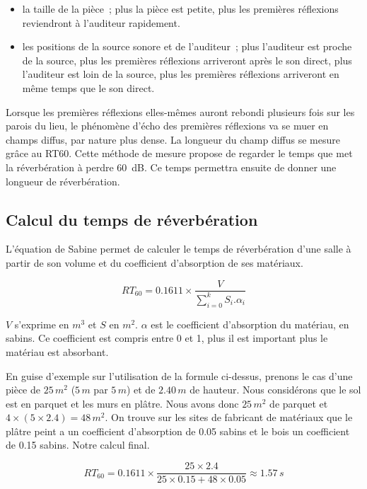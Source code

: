 \documentclass[
  letterpaper,
  DIV=11,
  numbers=noendperiod]{scrreprt}
\providecommand{\tightlist}{%
  \setlength{\itemsep}{0pt}\setlength{\parskip}{0pt}}\usepackage{longtable,booktabs,array}
\begin{document}
\begin{itemize}
\tightlist
\item
  la taille de la pièce~; plus la pièce est petite, plus les premières
  réflexions reviendront à l'auditeur rapidement.
\item
  les positions de la source sonore et de l'auditeur~; plus l'auditeur
  est proche de la source, plus les premières réflexions arriveront
  après le son direct, plus l'auditeur est loin de la source, plus les
  premières réflexions arriveront en même temps que le son direct.
\end{itemize}

Lorsque les premières réflexions elles-mêmes auront rebondi plusieurs
fois sur les parois du lieu, le phénomène d'écho des premières
réflexions va se muer en champs diffus, par nature plus dense. La
longueur du champ diffus se mesure grâce au RT60. Cette méthode de
mesure propose de regarder le temps que met la réverbération à perdre
60~dB. Ce temps permettra ensuite de donner une longueur de
réverbération.

\hypertarget{calcul-du-temps-de-ruxe9verbuxe9ration}{%
\subsection{Calcul du temps de
réverbération}\label{calcul-du-temps-de-ruxe9verbuxe9ration}}

L'équation de Sabine permet de calculer le temps de réverbération d'une
salle à partir de son volume et du coefficient d'absorption de ses
matériaux.

\[RT_{60} = 0.1611 \times \frac{V}{\sum_{i=0}^{k} S_i.\alpha_i}\]

\(V\) s'exprime en \(m^3\) et \(S\) en \(m^2\). \(\alpha\) est le
coefficient d'absorption du matériau, en sabins. Ce coefficient est
compris entre 0 et 1, plus il est important plus le matériau est
absorbant.

En guise d'exemple sur l'utilisation de la formule ci-dessus, prenons le
cas d'une pièce de \(25\,m^2\) (\(5\,m\) par \(5\,m\)) et de \(2.40\,m\)
de hauteur. Nous considérons que le sol est en parquet et les murs en
plâtre. Nous avons donc \(25\,m^2\) de parquet et
\(4\times(5\times2.4)=48\,m^2\). On trouve sur les sites de fabricant de
matériaux que le plâtre peint a un coefficient d'absorption de 0.05
sabins et le bois un coefficient de 0.15 sabins. Notre calcul final.

\[RT_{60} = 0.1611 \times \frac{25 \times 2.4}{25\times0.15+48\times0.05} \approx 1.57\,s\]
\end{document}
